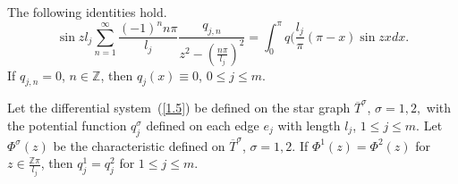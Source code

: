 \documentclass[10pt,a4paper]{amsart}
\begin{document}
\begin{lemma}\label{LL33}
The following identities hold.
\begin{equation}
\sin{z l_{j}}\sum_{n=1}^{\infty}\frac{(-1)^{n}n\pi}{l_{j}}\frac{q_{j,n}}{z^{2}-(\frac{n\pi}{l_{j}})^{2}}=\int_{0}^{\pi}q(\frac{l_{j}}{\pi}(\pi-x)\sin{zx}dx.
\end{equation}
If $q_{j,n}=0$, $n\in\mathbb{Z}$, then $q_{j}(x)\equiv0$, $0\leq j\leq m$.
\end{lemma}

\begin{theorem}\label{T3.3}
Let the differential system~(\ref{1.5}) be defined on the star graph 
$\overline{T}^{\sigma}$, $\sigma=1,2,$ with the potential function $q^{\sigma}_{j}$ defined on each  edge $e_{j}$ with length $l_{j}$, $1\leq j\leq m$. Let $\Phi^{\sigma}(z)$ be the characteristic defined on $\overline{T}^{\sigma}$, $\sigma=1,2.$ If $ \Phi^{1}(z)=\Phi^{2}(z)$ for $z\in\frac{\mathbb{Z}\pi}{l_{j}}$, then $q^{1}_{j}=q^{2}_{j}$ for $1\leq j\leq m$.
\end{theorem}
\end{document}
